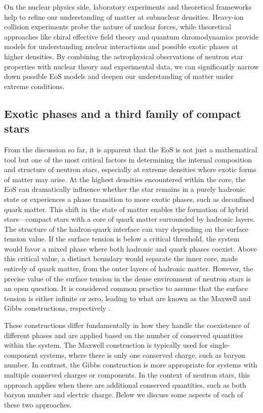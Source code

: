 \documentclass[main.tex]{subfiles}
\begin{document}
    On the nuclear physics side, laboratory experiments and theoretical frameworks help to refine our understanding of matter at subnuclear densities. Heavy-ion collision experiments probe the nature of nuclear forces, while theoretical approaches like chiral effective field theory and quantum chromodynamics provide models for understanding nuclear interactions and possible exotic phases at higher densities. By combining the astrophysical observations of neutron star properties with nuclear theory and experimental data, we can significantly narrow down possible EoS models and deepen our understanding of matter under extreme conditions.

    \newpage
    \subsection{Exotic phases and a third family of compact stars}
    From the discussion so far, it is apparent that the EoS is not just a mathematical tool but one of the most critical factors in determining the internal composition and structure of neutron stars, especially at extreme densities where exotic forms of matter may arise. At the highest densities encountered within the core, the EoS can dramatically influence whether the star remains in a purely hadronic state or experiences a phase transition to more exotic phases, such as deconfined quark matter. This shift in the state of matter enables the formation of hybrid stars---compact stars with a core of quark matter surrounded by hadronic layers. The structure of the hadron-quark interface can vary depending on the surface tension value. If the surface tension is below a critical threshold, the system would favor a mixed phase where both hadronic and quark phases coexist. Above this critical value, a distinct boundary would separate the inner core, made entirely of quark matter, from the outer layers of hadronic matter. However, the precise value of the surface tension in the dense environment of neutron stars is an open question. It is considered common practice to assume that the surface tension is either infinite or zero, leading to what are known as the Maxwell and Gibbs constructions, respectively \citep{PhysRevD.109.063022}.

    These constructions differ fundamentally in how they handle the coexistence of different phases and are applied based on the number of conserved quantities within the system. The Maxwell construction is typically used for single-component systems, where there is only one conserved charge, such as baryon number. In contrast, the Gibbs construction is more appropriate for systems with multiple conserved charges or components. In the context of neutron stars, this approach applies when there are additional conserved quantities, such as both baryon number and electric charge. Below we discuss some aspects of each of these two approaches.
    
\end{document}
